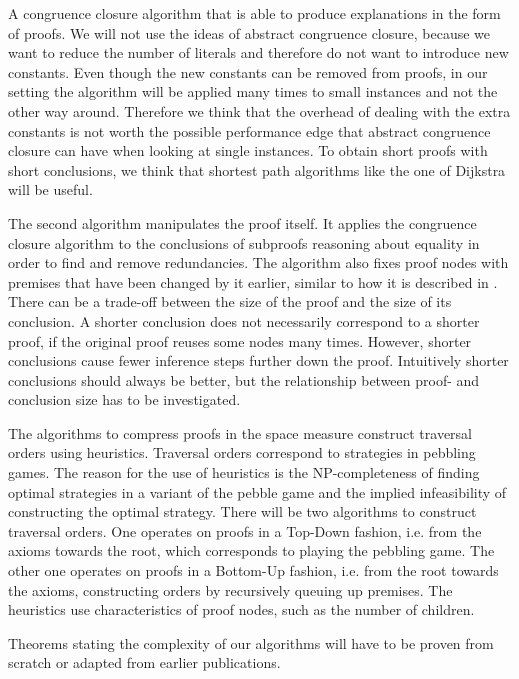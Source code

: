 A congruence closure algorithm that is able to produce explanations in the form of proofs.
We will not use the ideas of abstract congruence closure, because we want to reduce the number of literals and therefore do not want to introduce new constants.
Even though the new constants can be removed from proofs, in our setting the algorithm will be applied many times to small instances and not the other way around. 
Therefore we think that the overhead of dealing with the extra constants is not worth the possible performance edge \cite{Bachmair2000} that abstract congruence closure can have when looking at single instances.
To obtain short proofs with short conclusions, we think that shortest path algorithms like the one of Dijkstra \cite{Dijkstra1959,Cormen1989} will be useful.

The second algorithm manipulates the proof itself.
It applies the congruence closure algorithm to the conclusions of subproofs reasoning about equality in order to find and remove redundancies.
The algorithm also fixes proof nodes with premises that have been changed by it earlier, similar to how it is described in \cite{Boudou2013}.
There can be a trade-off between the size of the proof and the size of its conclusion.
A shorter conclusion does not necessarily correspond to a shorter proof, if the original proof reuses some nodes many times.
However, shorter conclusions cause fewer inference steps further down the proof.
Intuitively shorter conclusions should always be better, but the relationship between proof- and conclusion size has to be investigated.


The algorithms to compress proofs in the space measure construct traversal orders using heuristics.
Traversal orders correspond to strategies in pebbling games.
The reason for the use of heuristics is the NP-completeness of finding optimal strategies in a variant of the pebble game \cite{Sethi1975} and the implied infeasibility of constructing the optimal strategy.
There will be two algorithms to construct traversal orders.
One operates on proofs in a Top-Down fashion, i.e. from the axioms towards the root, which corresponds to playing the pebbling game.
The other one operates on proofs in a Bottom-Up fashion, i.e. from the root towards the axioms, constructing orders by recursively queuing up premises.
The heuristics use characteristics of proof nodes, such as the number of children.

Theorems stating the complexity of our algorithms will have to be proven from scratch or adapted from earlier publications.

